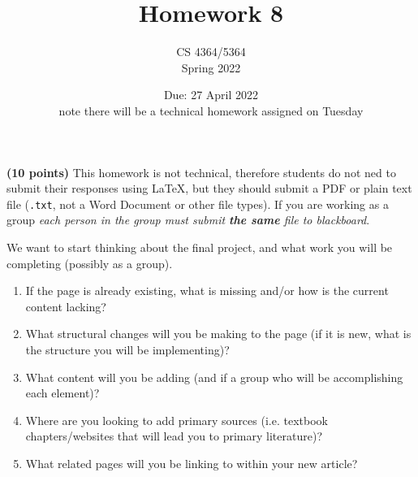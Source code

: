\documentclass[11pt, oneside]{article}   	%
\title{Homework 8}
\author{CS 4364/5364\\Spring 2022}
\date{Due: 27 April 2022\\note there will be a technical homework assigned on Tuesday}							%
\begin{document}
\maketitle

\textbf{(10 points)} This homework is not technical, therefore students do not ned to submit their responses using \LaTeX, 
but they should submit a PDF or plain text file (\texttt{.txt}, not a Word Document or other file types). 
If you are working as a group \emph{each person in the group must submit \textbf{the same} file to blackboard}.

We want to start thinking about the final project, and what work you will be completing (possibly as a group). 

\begin{enumerate}
\item If the page is already existing, what is missing and/or how is the current content lacking? 

\item What structural changes will you be making to the page (if it is new, what is the structure you will be implementing)? 

\item What content will you be adding (and if a group who will be accomplishing each element)? 

\item Where are you looking to add primary sources (i.e. textbook chapters/websites that will lead you to primary literature)? 

\item What related pages will you be linking to within your new article? 

\end{enumerate}
\end{document}
